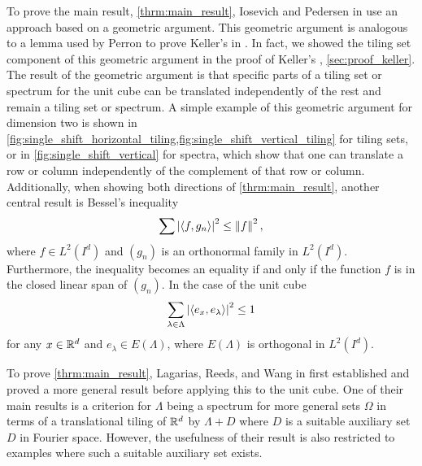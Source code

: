 \documentclass[../thesis.tex]{subfiles}
\begin{document}
To prove the main result, \cref{thrm:main_result}, Iosevich and Pedersen in \cite{iosevichSpectralTilingProperties1998} use an approach based on a geometric argument. This geometric argument is analogous to a lemma used by Perron to prove Keller's  in \cite{perronUeberLueckenloseAusfuellung1940}. In fact, we showed the tiling set component of this geometric argument in the proof of Keller's , \cref{sec:proof_keller}. The result of the geometric argument is that specific parts of a tiling set or spectrum for the unit cube can be translated independently of the rest and remain a tiling set or spectrum. A simple example of this geometric argument for dimension two is shown in \cref{fig:single_shift_horizontal_tiling,fig:single_shift_vertical_tiling} for tiling sets, or in \cref{fig:single_shift_vertical} for spectra, which show that one can translate a row or column independently of the complement of that row or column. Additionally, when showing both directions of \cref{thrm:main_result}, another central result is Bessel's inequality
\begin{equation*}%
    \sum\bralMed{\braaMed{f,g_n}}^2 \leq \branMed{f}^2,
\end{equation*}
where $f\in L^2(I^d)$ and $(g_n)$ is an orthonormal family in $L^2(I^d)$. Furthermore, the inequality becomes an equality if and only if the function $f$ is in the closed linear span of $(g_n)$. In the case of the unit cube
\begin{equation*}
    \sum_{\lambda \in \Lambda} \left|\left \langle e_x,e_\lambda \right \rangle\right|^2 \leq 1
\end{equation*}
for any $x\in \mathbb{R}^d$ and $e_\lambda\in E(\Lambda)$, where $E(\Lambda)$ is orthogonal in $L^2(I^d)$. 






To prove \cref{thrm:main_result}, Lagarias, Reeds, and Wang in \cite{lagariasOrthonormalBasesExponentials2000} first established and proved a more general result before applying this to the unit cube. One of their main results is a criterion for $\Lambda$ being a spectrum for more general sets $\Omega$ in terms of a translational tiling of $\mathbb{R}^d$ by $\Lambda+D$ where $D$ is a suitable auxiliary set $D$ in Fourier space. However, the usefulness of their result is also restricted to examples where such a suitable auxiliary set exists. 
\end{document}
